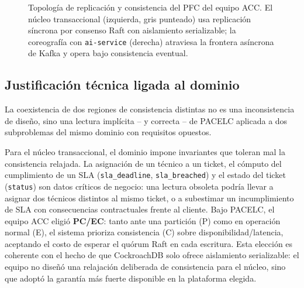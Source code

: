 \documentclass[11pt,a4paper]{article}
\begin{document}
\begin{figure}[ht]
{%
}
\caption{Topolog\'ia de replicaci\'on y consistencia del PFC del equipo ACC. El n\'ucleo
transaccional (izquierda, gris punteado) usa replicaci\'on s\'incrona por consenso Raft con
aislamiento serializable; la coreograf\'ia con \texttt{ai-service} (derecha) atraviesa la frontera
as\'incrona de Kafka y opera bajo consistencia eventual.}
\label{fig:topologia}
\end{figure}

\subsection{Justificaci\'on t\'ecnica ligada al dominio}
\label{subsec:justificacion}

La coexistencia de dos regiones de consistencia distintas no es una inconsistencia de dise\~no,
sino una lectura impl\'icita -- y correcta -- de PACELC aplicada a dos subproblemas del mismo
dominio con requisitos opuestos.

Para el n\'ucleo transaccional, el dominio impone invariantes que toleran mal la
consistencia relajada. La asignaci\'on de un t\'ecnico a un ticket, el c\'omputo del cumplimiento
de un SLA (\texttt{sla\_deadline}, \texttt{sla\_breached}) y el estado del ticket
(\texttt{status}) son datos cr\'iticos de negocio: una lectura obsoleta podr\'ia llevar a asignar
dos t\'ecnicos distintos al mismo ticket, o a subestimar un incumplimiento de SLA con
consecuencias contractuales frente al cliente. Bajo PACELC, el equipo ACC eligi\'o
\textbf{PC/EC}: tanto ante una partici\'on (P) como en operaci\'on normal (E), el sistema prioriza
consistencia (C) sobre disponibilidad/latencia, aceptando el costo de esperar el qu\'orum Raft en
cada escritura. Esta elecci\'on es coherente con el hecho de que CockroachDB solo ofrece
aislamiento serializable: el equipo no dise\~n\'o una relajaci\'on deliberada de consistencia para
el n\'ucleo, sino que adopt\'o la garant\'ia m\'as fuerte disponible en la plataforma elegida.
\end{document}
